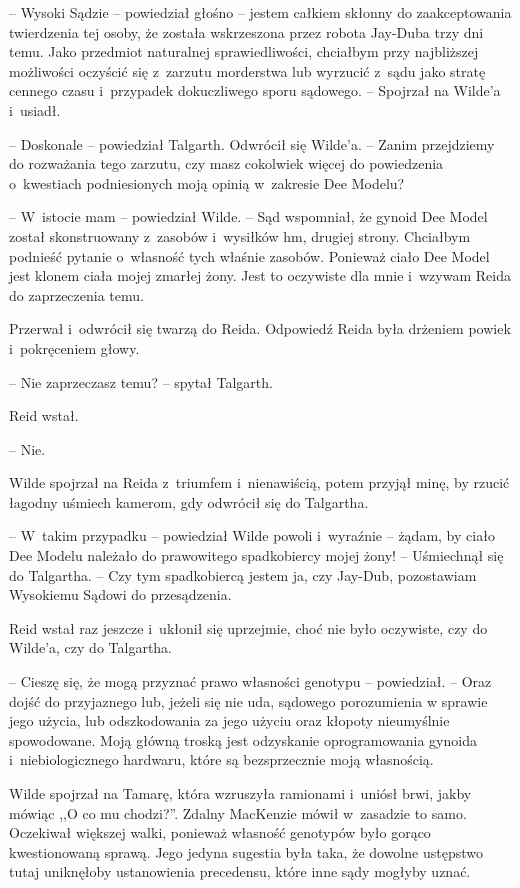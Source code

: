 \documentclass[oneside,polish,11pt,sfheadings]{mwbk}
\begin{document}
-- Wysoki Sądzie -- powiedział głośno -- jestem całkiem skłonny do zaakceptowania twierdzenia tej osoby, że
została wskrzeszona przez robota Jay-Duba trzy dni temu. Jako przedmiot
naturalnej sprawiedliwości, chciałbym przy najbliższej możliwości
oczyścić się z~zarzutu morderstwa lub wyrzucić z~sądu jako stratę
cennego czasu i~przypadek dokuczliwego sporu sądowego. -- Spojrzał na
Wilde'a i~usiadł.

-- Doskonale -- powiedział Talgarth. Odwrócił się Wilde'a. -- Zanim
przejdziemy do rozważania tego zarzutu, czy masz cokolwiek więcej do
powiedzenia o~kwestiach podniesionych moją opinią w~zakresie Dee Modelu?

-- W~istocie mam -- powiedział Wilde. -- Sąd wspomniał, że gynoid Dee Model
został skonstruowany z~zasobów i~wysiłków hm, drugiej strony. Chciałbym
podnieść pytanie o~własność tych właśnie zasobów. Ponieważ ciało Dee
Model jest klonem ciała mojej zmarłej żony. Jest to oczywiste dla mnie i~wzywam Reida do zaprzeczenia temu.

Przerwał i~odwrócił się twarzą do Reida. Odpowiedź Reida była drżeniem
powiek i~pokręceniem głowy.

-- Nie zaprzeczasz temu? -- spytał Talgarth.

Reid wstał. 

-- Nie.

Wilde spojrzał na Reida z~triumfem i~nienawiścią, potem przyjął minę, by
rzucić łagodny uśmiech kamerom, gdy odwrócił się do Talgartha.

-- W~takim przypadku -- powiedział Wilde powoli i~wyraźnie -- żądam, by
ciało Dee Modelu należało do prawowitego spadkobiercy mojej żony! -- Uśmiechnął się do Talgartha. -- Czy tym spadkobiercą jestem ja, czy
Jay-Dub, pozostawiam Wysokiemu Sądowi do przesądzenia.

Reid wstał raz jeszcze i~ukłonił się uprzejmie, choć nie było oczywiste,
czy do Wilde'a, czy do Talgartha.

-- Cieszę się, że mogą przyznać prawo własności genotypu -- powiedział. -- Oraz dojść do przyjaznego lub, jeżeli się nie uda, sądowego porozumienia
w sprawie jego użycia, lub odszkodowania za jego użyciu oraz kłopoty
nieumyślnie spowodowane. Moją główną troską jest odzyskanie
oprogramowania gynoida i~niebiologicznego hardwaru, które są
bezsprzecznie moją własnością.

Wilde spojrzał na Tamarę, która wzruszyła ramionami i~uniósł brwi, jakby
mówiąc ,,O co mu chodzi?''. Zdalny MacKenzie mówił w~zasadzie to samo.
Oczekiwał większej walki, ponieważ własność genotypów było gorąco
kwestionowaną sprawą. Jego jedyna sugestia była taka, że dowolne
ustępstwo tutaj uniknęłoby ustanowienia precedensu, które inne sądy
mogłyby uznać.
\end{document}
